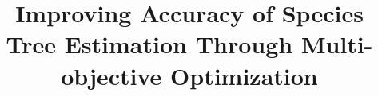 \documentclass[runningheads]{llncs}
\begin{document}
%
\title{Improving Accuracy of Species Tree Estimation Through Multi-objective Optimization}
\author{}
\institute{}
%
\maketitle              %
%

 
 







%
%
%



%
\end{document}
